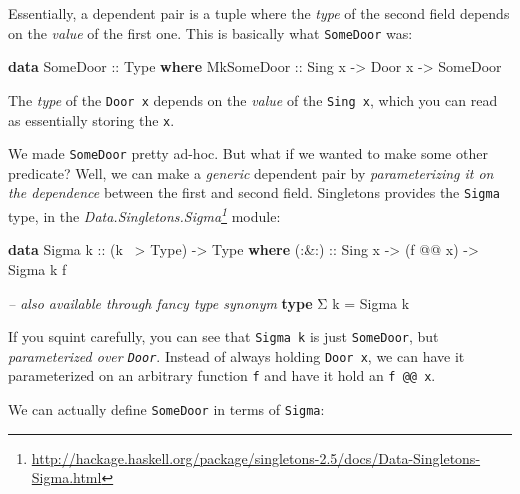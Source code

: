 \documentclass[]{article}
\newenvironment{Shaded}{}{}
\newcommand{\CommentTok}[1]{\textcolor[rgb]{0.38,0.63,0.69}{\textit{#1}}}
\newcommand{\DataTypeTok}[1]{\textcolor[rgb]{0.56,0.13,0.00}{#1}}
\newcommand{\FunctionTok}[1]{\textcolor[rgb]{0.02,0.16,0.49}{#1}}
\newcommand{\KeywordTok}[1]{\textcolor[rgb]{0.00,0.44,0.13}{\textbf{#1}}}
\newcommand{\NormalTok}[1]{#1}
\newcommand{\OtherTok}[1]{\textcolor[rgb]{0.00,0.44,0.13}{#1}}
\renewcommand{\href}[2]{#2\footnote{\url{#1}}}
\begin{document}
Essentially, a dependent pair is a tuple where the \emph{type} of the second
field depends on the \emph{value} of the first one. This is basically what
\texttt{SomeDoor} was:

\begin{Shaded}
\begin{Highlighting}[]
\KeywordTok{data} \DataTypeTok{SomeDoor}\OtherTok{ ::} \DataTypeTok{Type} \KeywordTok{where}
    \DataTypeTok{MkSomeDoor}\OtherTok{ ::} \DataTypeTok{Sing}\NormalTok{ x }\OtherTok{->} \DataTypeTok{Door}\NormalTok{ x }\OtherTok{->} \DataTypeTok{SomeDoor}
\end{Highlighting}
\end{Shaded}

The \emph{type} of the \texttt{Door\ x} depends on the \emph{value} of the
\texttt{Sing\ x}, which you can read as essentially storing the \texttt{x}.

We made \texttt{SomeDoor} pretty ad-hoc. But what if we wanted to make some
other predicate? Well, we can make a \emph{generic} dependent pair by
\emph{parameterizing it on the dependence} between the first and second field.
Singletons provides the \texttt{Sigma} type, in the
\emph{\href{http://hackage.haskell.org/package/singletons-2.5/docs/Data-Singletons-Sigma.html}{Data.Singletons.Sigma}}
module:

\begin{Shaded}
\begin{Highlighting}[]
\KeywordTok{data} \DataTypeTok{Sigma}\OtherTok{ k ::}\NormalTok{ (k }\FunctionTok{~>} \DataTypeTok{Type}\NormalTok{) }\OtherTok{->} \DataTypeTok{Type} \KeywordTok{where}
\OtherTok{    (:&:) ::} \DataTypeTok{Sing}\NormalTok{ x }\OtherTok{->}\NormalTok{ (f }\FunctionTok{@@}\NormalTok{ x) }\OtherTok{->} \DataTypeTok{Sigma}\NormalTok{ k f}

\CommentTok{-- also available through fancy type synonym}
\KeywordTok{type}\NormalTok{ Σ k }\FunctionTok{=} \DataTypeTok{Sigma}\NormalTok{ k}
\end{Highlighting}
\end{Shaded}

If you squint carefully, you can see that \texttt{Sigma\ k} is just
\texttt{SomeDoor}, but \emph{parameterized over \texttt{Door}}. Instead of
always holding \texttt{Door\ x}, we can have it parameterized on an arbitrary
function \texttt{f} and have it hold an \texttt{f\ @@\ x}.

We can actually define \texttt{SomeDoor} in terms of \texttt{Sigma}:
\end{document}
